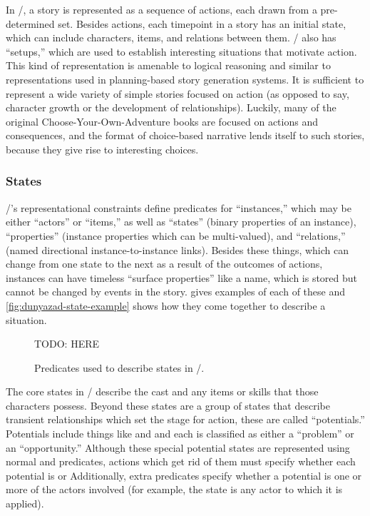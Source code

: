 In \dunyazad/, a story is represented as a sequence of actions, each drawn from a pre-determined set.
%
Besides actions, each timepoint in a story has an initial state, which can include characters, items, and relations between them.
%
\dunyazad/ also has ``setups,'' which are used to establish interesting situations that motivate action.
%
This kind of representation is amenable to logical reasoning and similar to representations used in planning-based story generation systems.
%
It is sufficient to represent a wide variety of simple stories focused on action (as opposed to say, character growth or the development of relationships).
%
Luckily, many of the original Choose-Your-Own-Adventure books are focused on actions and consequences, and the format of choice-based narrative lends itself to such stories, because they give rise to interesting choices.


\subsubsection{States}

\dunyazad/'s representational constraints define predicates for ``instances,'' which may be either ``actors'' or ``items,'' as well as ``states'' (binary properties of an instance), ``properties'' (instance properties which can be multi-valued), and ``relations,'' (named directional instance-to-instance links).
%
Besides these things, which can change from one state to the next as a result of the outcomes of actions, instances can have timeless ``surface properties'' like a name, which is stored but cannot be changed by events in the story.
%
 gives examples of each of these and \cref{fig:dunyazad-state-example} shows how they come together to describe a situation.


\begin{figure}[!t]
\centering
TODO: HERE
\caption[\dunyazad/'s State Predicates]{Predicates used to describe states in \dunyazad/.}
\label{fig:dunyazad-states}
\end{figure}


The core states in \dunyazad/ describe the cast and any items or skills that those characters possess.
%
Beyond these states are a group of states that describe transient relationships which set the stage for action, these are called ``potentials.''
%
Potentials include things like   and  and each is classified as either a ``problem'' or an ``opportunity.''
%
Although these special potential states are represented using normal   and  predicates, actions which get rid of them must specify whether each potential is   or 
%
Additionally, extra predicates specify whether a potential is  one or more of the actors involved (for example, the  state is  any actor to which it is applied).


